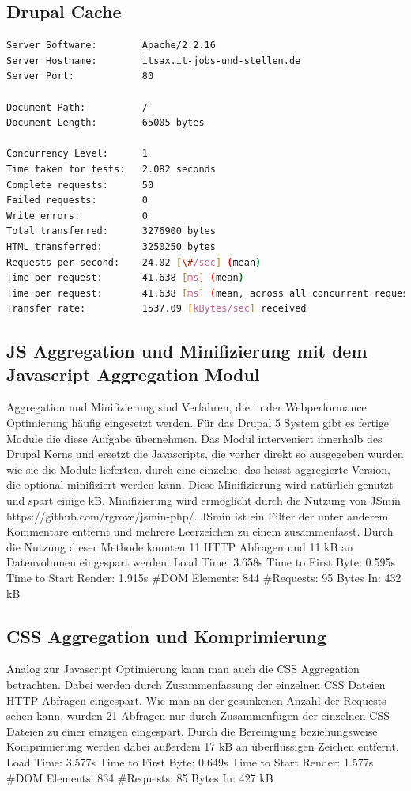 \subsection{Drupal Cache}
\begin{lstlisting}[language=bash,label=Ausgabe von ab,caption=Ausgabe von ab]
Server Software:        Apache/2.2.16
Server Hostname:        itsax.it-jobs-und-stellen.de
Server Port:            80

Document Path:          /
Document Length:        65005 bytes

Concurrency Level:      1
Time taken for tests:   2.082 seconds
Complete requests:      50
Failed requests:        0
Write errors:           0
Total transferred:      3276900 bytes
HTML transferred:       3250250 bytes
Requests per second:    24.02 [\#/sec] (mean)
Time per request:       41.638 [ms] (mean)
Time per request:       41.638 [ms] (mean, across all concurrent requests)
Transfer rate:          1537.09 [kBytes/sec] received
\end{lstlisting}



\subsection{JS Aggregation und Minifizierung mit dem Javascript Aggregation Modul}
Aggregation und Minifizierung sind Verfahren, die in der Webperformance Optimierung häufig eingesetzt werden. Für das Drupal 5 System gibt es fertige Module die diese Aufgabe übernehmen. Das Modul interveniert innerhalb des Drupal Kerns und ersetzt die Javascripts, die vorher direkt so ausgegeben wurden wie sie die Module lieferten, durch eine einzelne, das heisst aggregierte Version, die optional minifiziert werden kann. Diese Minifizierung wird natürlich genutzt und spart einige kB. Minifizierung wird ermöglicht durch die Nutzung von JSmin https://github.com/rgrove/jsmin-php/. JSmin ist ein Filter der unter anderem Kommentare entfernt und mehrere Leerzeichen zu einem zusammenfasst. Durch die Nutzung dieser Methode konnten 11 HTTP Abfragen und 11 kB an Datenvolumen eingespart werden.
Load Time: 3.658s
Time to First Byte: 0.595s
Time to Start Render: 1.915s
\#DOM Elements: 844 	
\#Requests: 95 %
Bytes In: 432 kB

\subsection{CSS Aggregation und Komprimierung}
Analog zur Javascript Optimierung kann man auch die CSS Aggregation betrachten. Dabei werden durch Zusammenfassung der einzelnen CSS Dateien HTTP Abfragen eingespart. Wie man an der gesunkenen Anzahl der Requests sehen kann, wurden 21 Abfragen nur durch Zusammenfügen der einzelnen CSS Dateien zu einer einzigen eingespart. Durch die Bereinigung beziehungsweise Komprimierung werden dabei außerdem 17 kB an überflüssigen Zeichen entfernt. 
Load Time: 3.577s
Time to First Byte: 0.649s
Time to Start Render: 1.577s
\#DOM Elements: 834 	
\#Requests: 85 %
Bytes In: 427 kB
